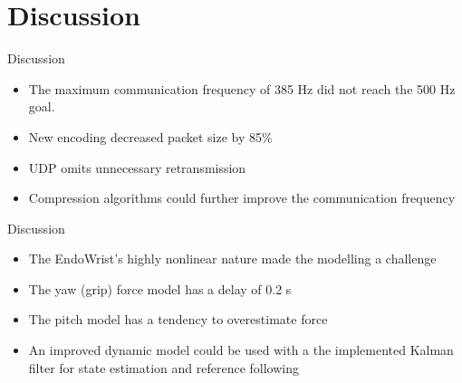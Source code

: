 \section{Discussion}
\begin{frame}{Discussion}{}


  \begin{itemize}
  	\item The maximum communication frequency of 385 Hz did not reach the 500 Hz goal.
  	\item New encoding  decreased packet size by 85\%
  	\item UDP omits unnecessary retransmission
  	\item Compression algorithms could further improve the communication frequency

  	
   
  \end{itemize}


\end{frame}

\begin{frame}{Discussion}{}
	
	
	\begin{itemize}
		\item The EndoWrist's highly nonlinear nature made the modelling a challenge
		\item The yaw (grip) force model has a delay of 0.2 s 
		\item The pitch model has a tendency to overestimate force
		\item An improved dynamic model could be used with a the implemented Kalman filter for state estimation and reference following
	\end{itemize}
	
	
\end{frame}




